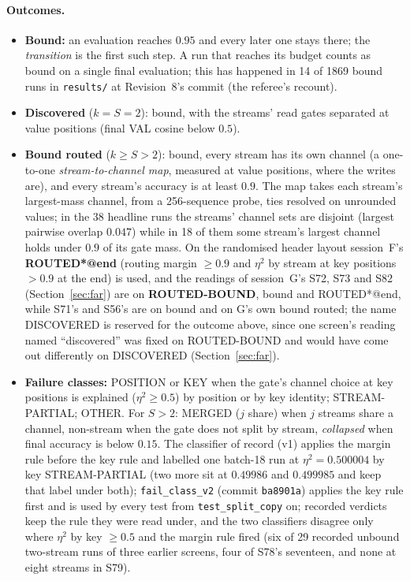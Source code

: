 \documentclass[11pt]{article}
\begin{document}
\paragraph{Outcomes.}
\begin{itemize}
\item \textbf{Bound:} an evaluation reaches $0.95$ and every later one stays there; the \emph{transition} is the first such step. A run that reaches its budget counts as bound on a single final evaluation; this has happened in 14 of 1869 bound runs in \texttt{results/} at Revision~8's commit (the referee's recount).
\item \textbf{Discovered} ($k = S = 2$): bound, with the streams' read gates separated at value positions (final VAL cosine below $0.5$).
\item \textbf{Bound routed} ($k \geq S > 2$): bound, every stream has its own channel (a one-to-one \emph{stream-to-channel map}, measured at value positions, where the writes are), and every stream's accuracy is at least $0.9$. The map takes each stream's largest-mass channel, from a 256-sequence probe, ties resolved on unrounded values; in the 38 headline runs the streams' channel sets are disjoint (largest pairwise overlap $0.047$) while in 18 of them some stream's largest channel holds under $0.9$ of its gate mass. On the randomised header layout session~F's \textbf{ROUTED*@end} (routing margin $\geq 0.9$ and $\eta^2$ by stream at key positions $> 0.9$ at the end) is used, and the readings of session~G's S72, S73 and S82 (Section~\ref{sec:far}) are on \textbf{ROUTED-BOUND}, bound and ROUTED*@end, while S71's and S56's are on bound and on G's own bound routed; the name DISCOVERED is reserved for the outcome above, since one screen's reading named ``discovered'' was fixed on ROUTED-BOUND and would have come out differently on DISCOVERED (Section~\ref{sec:far}).
\item \textbf{Failure classes:} POSITION or KEY when the gate's channel choice at key positions is explained ($\eta^2 \geq 0.5$) by position or by key identity; STREAM-PARTIAL; OTHER. For $S > 2$: MERGED ($j$ share) when $j$ streams share a channel, non-stream when the gate does not split by stream, \emph{collapsed} when final accuracy is below $0.15$. The classifier of record (v1) applies the margin rule before the key rule and labelled one batch-18 run at $\eta^2 = 0.500004$ by key STREAM-PARTIAL (two more sit at $0.49986$ and $0.499985$ and keep that label under both); \texttt{fail\_class\_v2} (commit \texttt{ba8901a}) applies the key rule first and is used by every test from \texttt{test\_split\_copy} on; recorded verdicts keep the rule they were read under, and the two classifiers disagree only where $\eta^2$ by key $\geq 0.5$ and the margin rule fired (six of 29 recorded unbound two-stream runs of three earlier screens, four of S78's seventeen, and none at eight streams in S79).
\end{itemize}
\end{document}
